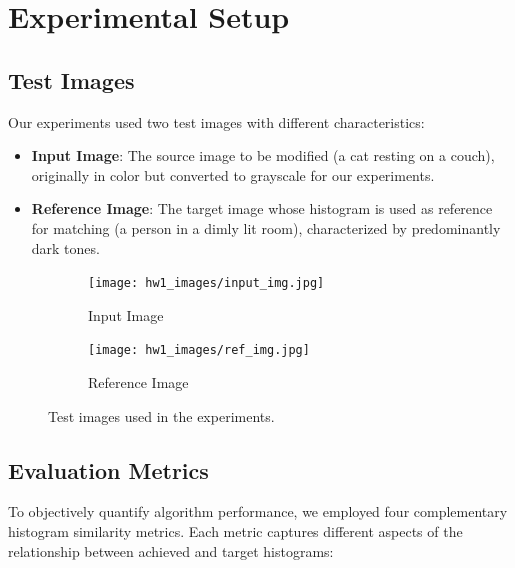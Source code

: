 \documentclass[12pt,a4paper]{article}
\begin{document}
\newpage


\section{Experimental Setup}

\subsection{Test Images}

Our experiments used two test images with different characteristics:
\begin{itemize}
    \item \textbf{Input Image}: The source image to be modified (a cat resting on a couch), originally in color but converted to grayscale for our experiments.
    \item \textbf{Reference Image}: The target image whose histogram is used as reference for matching (a person in a dimly lit room), characterized by predominantly dark tones.
\end{itemize}
\begin{figure}[H]
    \centering
    \begin{subfigure}{\textwidth}
        \centering
        \texttt{[image: hw1\_images/input\_img.jpg]}
        \caption{Input Image}
    \end{subfigure}
    
    \vspace{0.8cm}
    
    \begin{subfigure}{\textwidth}
        \centering
        \texttt{[image: hw1\_images/ref\_img.jpg]}
        \caption{Reference Image}
    \end{subfigure}
    \caption{Test images used in the experiments.}
    \label{fig:test_images}
\end{figure}

\subsection{Evaluation Metrics}

To objectively quantify algorithm performance, we employed four complementary histogram similarity metrics. Each metric captures different aspects of the relationship between achieved and target histograms:
\end{document}
